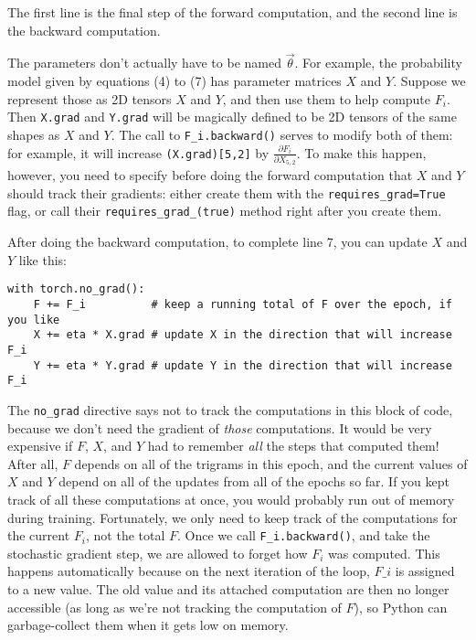 The first line is the final step of the forward computation, and the second line is the backward computation.

The parameters don’t actually have to be named $\vec{\theta}$. For example, the probability model given by equations (4) to (7) has parameter matrices $X$ and $Y$. Suppose we represent those as 2D tensors $X$ and $Y$, and then use them to help compute $F_i$. Then \texttt{X.grad} and \texttt{Y.grad} will be magically defined to be 2D tensors of the same shapes as $X$ and $Y$. The call to \texttt{F\_i.backward()} serves to modify both of them: for example, it will increase \texttt{(X.grad)[5,2]} by $\frac{\partial F_i}{\partial X_{5,2}}$. To make this happen, however, you need to specify before doing the forward computation that $X$ and $Y$ should track their gradients: either create them with the \texttt{requires\_grad=True} flag, or call their \texttt{requires\_grad\_(true)} method right after you create them.

After doing the backward computation, to complete line 7, you can update $X$ and $Y$ like this:
\begin{verbatim}
with torch.no_grad():
    F += F_i          # keep a running total of F over the epoch, if you like
    X += eta * X.grad # update X in the direction that will increase F_i
    Y += eta * Y.grad # update Y in the direction that will increase F_i
\end{verbatim}

The \texttt{no\_grad} directive says not to track the computations in this block of code, because we don’t need the gradient of \textit{those} computations. It would be very expensive if $F$, $X$, and $Y$ had to remember \textit{all} the steps that computed them! After all, $F$ depends on all of the trigrams in this epoch, and the current values of $X$ and $Y$ depend on all of the updates from all of the epochs so far. If you kept track of all these computations at once, you would probably run out of memory during training. Fortunately, we only need to keep track of the computations for the current $F_i$, not the total $F$. Once we call \texttt{F\_i.backward()}, and take the stochastic gradient step, we are allowed to forget how $F_i$ was computed. This happens automatically because on the next iteration of the loop, $F\_i$ is assigned to a new value. The old value and its attached computation are then no longer accessible (as long as we’re not tracking the computation of $F$), so Python can garbage-collect them when it gets low on memory.

